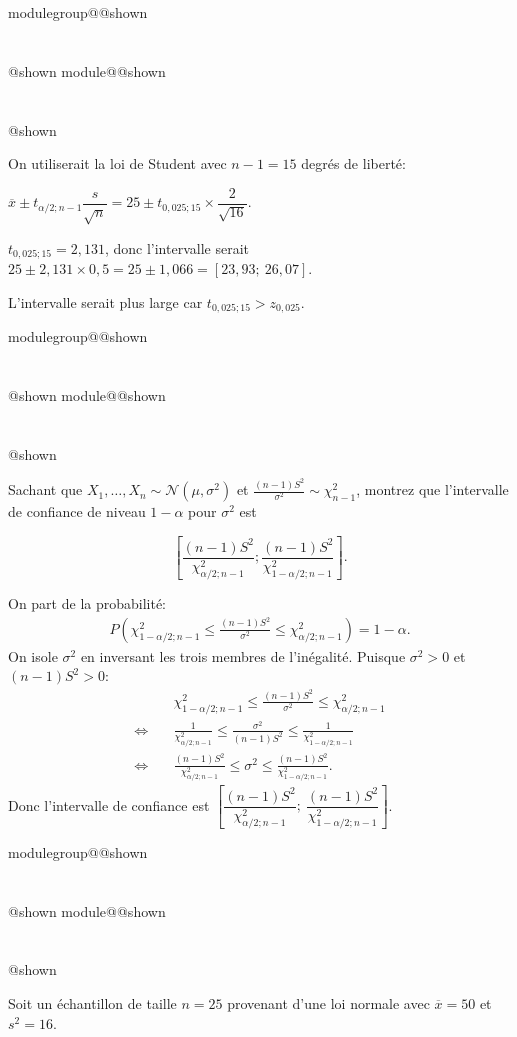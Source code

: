 \documentclass{Evaluation}
\makeatletter
\newcommand{\currentmodulekey}{}
\newcommand{\currentmoduletitle}{}
\newcommand{\currentgroupkey}{}
\newcommand{\currentgrouptitle}{}
\newcommand{\showmoduleifneeded}{%
  \ifx\currentgroupkey\empty\else
    \expandafter\ifx\csname modulegroup@\currentgroupkey @shown\endcsname\relax
      \section*{\currentgrouptitle}%
      \expandafter\gdef\csname modulegroup@\currentgroupkey @shown\endcsname{1}%
    \fi
  \fi
  \expandafter\ifx\csname module@\currentmodulekey @shown\endcsname\relax
    \section*{\currentmoduletitle}%
    \expandafter\gdef\csname module@\currentmodulekey @shown\endcsname{1}%
  \fi
}
\newenvironment{A25}{\showmoduleifneeded}{}
\makeatother
\begin{document}
\begin{questions}
\begin{A25}
\begin{parts}
    \begin{solution}
        On utiliserait la loi de Student avec $n-1=15$ degrés de liberté:

        $\overline{x} \pm t_{\alpha/2;n-1}\dfrac{s}{\sqrt{n}} = 25 \pm t_{0{,}025;15} \times \dfrac{2}{\sqrt{16}}$.

        $t_{0{,}025;15} = 2{,}131$, donc l'intervalle serait $25 \pm 2{,}131 \times 0{,}5 = 25 \pm 1{,}066 = [23{,}93;~26{,}07]$.

        L'intervalle serait plus large car $t_{0{,}025;15} > z_{0{,}025}$.
    \end{solution}
\end{parts}
\end{A25}

\begin{A25}
\question Sachant que $X_1,\ldots,X_n\sim\mathcal{N}(\mu,\sigma^2)$ et $\displaystyle\frac{(n-1)S^2}{\sigma^2}\sim\chi^2_{n-1}$, montrez que l'intervalle de confiance de niveau $1-\alpha$ pour $\sigma^2$ est

$$\left[\frac{(n-1)S^2}{\chi^2_{\alpha/2;n-1}};\frac{(n-1)S^2}{\chi^2_{1-\alpha/2;n-1}}\right].$$

\begin{solution}
    On part de la probabilité:
    \begin{align*}
        P\left(\chi^2_{1-\alpha/2;n-1} \leq \frac{(n-1)S^2}{\sigma^2} \leq \chi^2_{\alpha/2;n-1}\right) = 1-\alpha.
    \end{align*}
    On isole $\sigma^2$ en inversant les trois membres de l'inégalité. Puisque $\sigma^2 > 0$ et $(n-1)S^2 > 0$:
    \begin{align*}
        &\chi^2_{1-\alpha/2;n-1} \leq \frac{(n-1)S^2}{\sigma^2} \leq \chi^2_{\alpha/2;n-1}\\
        \Leftrightarrow\quad & \frac{1}{\chi^2_{\alpha/2;n-1}} \leq \frac{\sigma^2}{(n-1)S^2} \leq \frac{1}{\chi^2_{1-\alpha/2;n-1}}\\
        \Leftrightarrow\quad & \frac{(n-1)S^2}{\chi^2_{\alpha/2;n-1}} \leq \sigma^2 \leq \frac{(n-1)S^2}{\chi^2_{1-\alpha/2;n-1}}.
    \end{align*}
    Donc l'intervalle de confiance est $\left[\dfrac{(n-1)S^2}{\chi^2_{\alpha/2;n-1}};~\dfrac{(n-1)S^2}{\chi^2_{1-\alpha/2;n-1}}\right]$.
\end{solution}
\end{A25}

\begin{A25}
\question Soit un échantillon de taille $n=25$ provenant d'une loi normale avec $\overline{x}=50$ et $s^2=16$.


\end{A25}
\end{questions}
\end{document}
